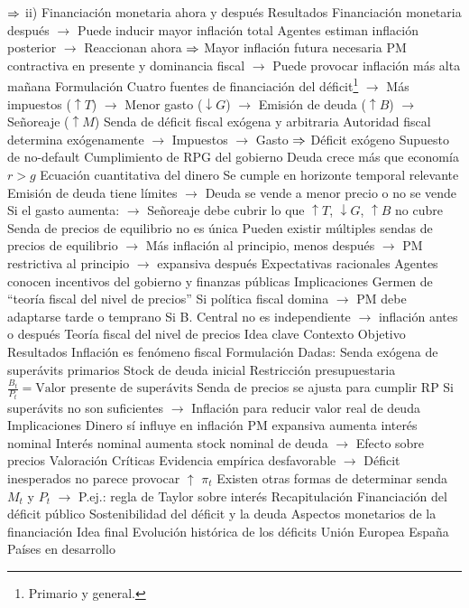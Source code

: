 \documentclass{nuevotema}
\begin{document}
\begin{esquemal}
				\4[] $\then$ ii) Financiación monetaria ahora y después
				\4 Resultados
				\4[] Financiación monetaria después
				\4[] $\to$ Puede inducir mayor inflación total
				\4[] Agentes estiman inflación posterior
				\4[] $\to$ Reaccionan ahora
				\4[] $\then$ Mayor inflación futura necesaria
				\4[] PM contractiva en presente y dominancia fiscal
				\4[] $\to$ Puede provocar inflación más alta mañana
			\3 Formulación
				\4 Cuatro fuentes de financiación del déficit\footnote{Primario y general.}
				\4[] $\to$ Más impuestos ($\uparrow T$)
				\4[] $\to$ Menor gasto ($\downarrow G$)
				\4[] $\to$ Emisión de deuda ($\uparrow B$)
				\4[] $\to$ Señoreaje ($\uparrow M$)
				\4 Senda de déficit fiscal exógena y arbitraria
				\4[] Autoridad fiscal determina exógenamente
				\4[] $\to$ Impuestos
				\4[] $\to$ Gasto
				\4[] $\then$ Déficit exógeno
				\4 Supuesto de no-default
				\4[] Cumplimiento de RPG del gobierno
				\4 Deuda crece más que economía
				\4[] $r > g$
				\4 Ecuación cuantitativa del dinero
				\4[] Se cumple en horizonte temporal relevante
				\4 Emisión de deuda tiene límites
				\4[] $\to$ Deuda se vende a menor precio o no se vende
				\4[] Si el gasto aumenta:
				\4[] $\to$ Señoreaje debe cubrir lo que $\uparrow T$, $\downarrow G$, $\uparrow B$ no cubre
				\4 Senda de precios de equilibrio no es única
				\4[] Pueden existir múltiples sendas de precios de equilibrio
				\4[] $\to$ Más inflación al principio, menos después
				\4[] $\to$ PM restrictiva al principio $\to$ expansiva después
				\4 Expectativas racionales
				\4[] Agentes conocen incentivos del gobierno y finanzas públicas
			\3 Implicaciones
				\4[] Germen de ``teoría fiscal del nivel de precios''
				\4[] Si política fiscal domina
				\4[] $\to$ PM debe adaptarse tarde o temprano
				\4[$\then$] Si B. Central no es independiente
				\4[]$\to$ inflación antes o después
		\2 Teoría fiscal del nivel de precios
			\3 Idea clave
				\4 Contexto
				\4 Objetivo
				\4 Resultados
				\4[] Inflación es fenómeno fiscal
			\3 Formulación
				\4 Dadas:
				\4[] Senda exógena de superávits primarios
				\4[] Stock de deuda inicial
				\4 Restricción presupuestaria
				\4[] $\frac{B_t}{P_t} = \text{Valor presente de superávits}$
				\4 Senda de precios se ajusta para cumplir RP
				\4[] Si superávits no son suficientes
				\4[] $\to$ Inflación para reducir valor real de deuda
			\3 Implicaciones
				\4 Dinero sí influye en inflación
				\4[] PM expansiva aumenta interés nominal
				\4[] Interés nominal aumenta stock nominal de deuda
				\4[] $\to$ Efecto sobre precios
			\3 Valoración
				\4 Críticas
				\4[] Evidencia empírica desfavorable
				\4[] $\to$ Déficit inesperados no parece provocar $\uparrow$ $\pi_t$
				\4[] Existen otras formas de determinar senda $M_t$ y $P_t$
				\4[] $\to$ P.ej.: regla de Taylor sobre interés
	\1[] 
		\2 Recapitulación
			\3 Financiación del déficit público
			\3 Sostenibilidad del déficit y la deuda
			\3 Aspectos monetarios de la financiación
		\2 Idea final
			\3 Evolución histórica de los déficits
			\3 Unión Europea
			\3 España
			\3 Países en desarrollo
\end{esquemal}
\end{document}
